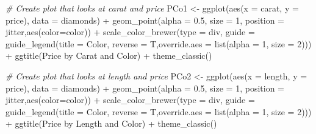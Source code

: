 \documentclass[
]{article}
\newenvironment{Shaded}{\begin{snugshade}}{\end{snugshade}}
\newcommand{\AttributeTok}[1]{\textcolor[rgb]{0.77,0.63,0.00}{#1}}
\newcommand{\CommentTok}[1]{\textcolor[rgb]{0.56,0.35,0.01}{\textit{#1}}}
\newcommand{\DecValTok}[1]{\textcolor[rgb]{0.00,0.00,0.81}{#1}}
\newcommand{\FloatTok}[1]{\textcolor[rgb]{0.00,0.00,0.81}{#1}}
\newcommand{\FunctionTok}[1]{\textcolor[rgb]{0.00,0.00,0.00}{#1}}
\newcommand{\NormalTok}[1]{#1}
\newcommand{\OtherTok}[1]{\textcolor[rgb]{0.56,0.35,0.01}{#1}}
\newcommand{\SpecialCharTok}[1]{\textcolor[rgb]{0.00,0.00,0.00}{#1}}
\newcommand{\StringTok}[1]{\textcolor[rgb]{0.31,0.60,0.02}{#1}}
\begin{document}
\begin{Shaded}
\begin{Highlighting}[]
\CommentTok{\# Create plot that looks at carat and price}
\NormalTok{PCo1 }\OtherTok{\textless{}{-}} \FunctionTok{ggplot}\NormalTok{(}\FunctionTok{aes}\NormalTok{(}\AttributeTok{x =}\NormalTok{ carat, }\AttributeTok{y =}\NormalTok{ price), }\AttributeTok{data =}\NormalTok{ diamonds) }\SpecialCharTok{+} \FunctionTok{geom\_point}\NormalTok{(}\AttributeTok{alpha =} \FloatTok{0.5}\NormalTok{, }\AttributeTok{size =} \DecValTok{1}\NormalTok{, }\AttributeTok{position =} \StringTok{\textquotesingle{}jitter\textquotesingle{}}\NormalTok{,}\FunctionTok{aes}\NormalTok{(}\AttributeTok{color=}\NormalTok{color)) }\SpecialCharTok{+}
  \FunctionTok{scale\_color\_brewer}\NormalTok{(}\AttributeTok{type =} \StringTok{\textquotesingle{}div\textquotesingle{}}\NormalTok{, }\AttributeTok{guide =} \FunctionTok{guide\_legend}\NormalTok{(}\AttributeTok{title =} \StringTok{\textquotesingle{}Color\textquotesingle{}}\NormalTok{, }\AttributeTok{reverse =}\NormalTok{ T,}\AttributeTok{override.aes =} \FunctionTok{list}\NormalTok{(}\AttributeTok{alpha =} \DecValTok{1}\NormalTok{, }\AttributeTok{size =} \DecValTok{2}\NormalTok{)))       }\SpecialCharTok{+} \FunctionTok{ggtitle}\NormalTok{(}\StringTok{\textquotesingle{}Price by Carat and Color\textquotesingle{}}\NormalTok{) }\SpecialCharTok{+} \FunctionTok{theme\_classic}\NormalTok{()}

\CommentTok{\# Create plot that looks at length and price}
\NormalTok{PCo2 }\OtherTok{\textless{}{-}} \FunctionTok{ggplot}\NormalTok{(}\FunctionTok{aes}\NormalTok{(}\AttributeTok{x =}\NormalTok{ length, }\AttributeTok{y =}\NormalTok{ price), }\AttributeTok{data =}\NormalTok{ diamonds) }\SpecialCharTok{+} \FunctionTok{geom\_point}\NormalTok{(}\AttributeTok{alpha =} \FloatTok{0.5}\NormalTok{, }\AttributeTok{size =} \DecValTok{1}\NormalTok{, }\AttributeTok{position =} \StringTok{\textquotesingle{}jitter\textquotesingle{}}\NormalTok{,}\FunctionTok{aes}\NormalTok{(}\AttributeTok{color=}\NormalTok{color)) }\SpecialCharTok{+}
  \FunctionTok{scale\_color\_brewer}\NormalTok{(}\AttributeTok{type =} \StringTok{\textquotesingle{}div\textquotesingle{}}\NormalTok{, }\AttributeTok{guide =} \FunctionTok{guide\_legend}\NormalTok{(}\AttributeTok{title =} \StringTok{\textquotesingle{}Color\textquotesingle{}}\NormalTok{, }\AttributeTok{reverse =}\NormalTok{ T,}\AttributeTok{override.aes =} \FunctionTok{list}\NormalTok{(}\AttributeTok{alpha =} \DecValTok{1}\NormalTok{, }\AttributeTok{size =} \DecValTok{2}\NormalTok{)))       }\SpecialCharTok{+} \FunctionTok{ggtitle}\NormalTok{(}\StringTok{\textquotesingle{}Price by Length and Color\textquotesingle{}}\NormalTok{) }\SpecialCharTok{+} \FunctionTok{theme\_classic}\NormalTok{()}


\end{Highlighting}
\end{Shaded}
\end{document}
